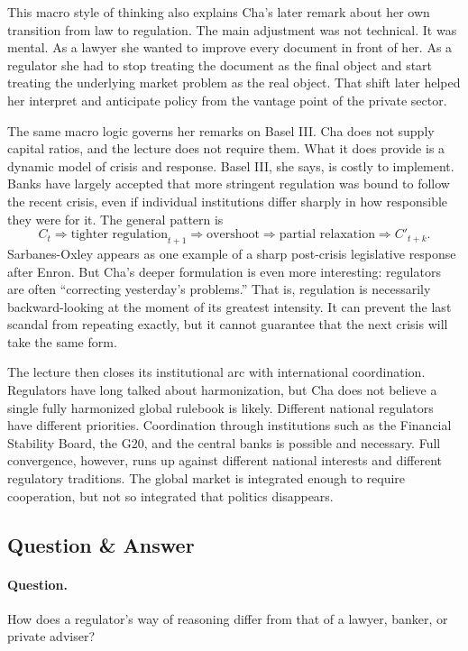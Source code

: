 This macro style of thinking also explains Cha's later remark about her own transition from law to regulation. The main adjustment was not technical. It was mental. As a lawyer she wanted to improve every document in front of her. As a regulator she had to stop treating the document as the final object and start treating the underlying market problem as the real object. That shift later helped her interpret and anticipate policy from the vantage point of the private sector.

The same macro logic governs her remarks on Basel III. Cha does not supply capital ratios, and the lecture does not require them. What it does provide is a dynamic model of crisis and response. Basel III, she says, is costly to implement. Banks have largely accepted that more stringent regulation was bound to follow the recent crisis, even if individual institutions differ sharply in how responsible they were for it. The general pattern is
\begin{equation}
C_t
\Rightarrow
\text{tighter regulation}_{t+1}
\Rightarrow
\text{overshoot}
\Rightarrow
\text{partial relaxation}
\Rightarrow
C'_{t+k}.
\end{equation}
Sarbanes-Oxley appears as one example of a sharp post-crisis legislative response after Enron. But Cha's deeper formulation is even more interesting: regulators are often ``correcting yesterday's problems.'' That is, regulation is necessarily backward-looking at the moment of its greatest intensity. It can prevent the last scandal from repeating exactly, but it cannot guarantee that the next crisis will take the same form.

The lecture then closes its institutional arc with international coordination. Regulators have long talked about harmonization, but Cha does not believe a single fully harmonized global rulebook is likely. Different national regulators have different priorities. Coordination through institutions such as the Financial Stability Board, the G20, and the central banks is possible and necessary. Full convergence, however, runs up against different national interests and different regulatory traditions. The global market is integrated enough to require cooperation, but not so integrated that politics disappears.

\subsection{Question \& Answer}

\paragraph{Question.} How does a regulator's way of reasoning differ from that of a lawyer, banker, or private adviser?

